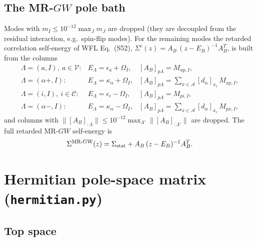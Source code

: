 \documentclass[11pt,a4paper]{article}
\newcommand{\code}[1]{\texttt{#1}}
\begin{document}
\subsection{The MR-$GW$ pole bath}
\label{sec:bath}

Modes with $m_I\le10^{-12}\max_Jm_J$ are dropped (they are decoupled from the
residual interaction, e.g.\ spin-flip modes).  For the remaining modes the
retarded correlation self-energy of WFL Eq.~(S52),
$\Sigma^{c}(z)=A_B\,(z-E_B)^{-1}A_B^{T}$, is built from the columns
\begin{equation}
\begin{array}{lll}
  \Lambda=(a,I),\ a\in\mathcal V: & E_\Lambda=\epsilon_a+\Omega_I, & [A_B]_{p\Lambda}=M_{ap,I},\\[0.5mm]
  \Lambda=(\alpha{+},I): & E_\Lambda=\kappa_\alpha+\Omega_I, & [A_B]_{p\Lambda}=\sum_{x\in\mathcal A}[d_\alpha]_{x_\ell}\,M_{xp,I},\\[0.5mm]
  \Lambda=(i,I),\ i\in\mathcal C: & E_\Lambda=\epsilon_i-\Omega_I, & [A_B]_{p\Lambda}=M_{pi,I},\\[0.5mm]
  \Lambda=(\alpha{-},I): & E_\Lambda=\kappa_\alpha-\Omega_I, & [A_B]_{p\Lambda}=\sum_{x\in\mathcal A}[d_\alpha]_{x_\ell}\,M_{px,I},
\end{array}
\label{eq:bath}
\end{equation}
and columns with $\|[A_B]_{:\Lambda}\|\le10^{-12}\max_{\Lambda'}\|[A_B]_{:\Lambda'}\|$
are dropped.  The full retarded MR-$GW$ self-energy is
\begin{equation}
  \Sigma^{\rm MR\text{-}GW}(z)=\Sigma_{\rm stat}+A_B\,(z-E_B)^{-1}A_B^{T}.
  \label{eq:sigma-mrgw}
\end{equation}

\section{Hermitian pole-space matrix (\code{hermitian.py})}
\label{sec:hermitian}

\subsection{Top space}
\end{document}
